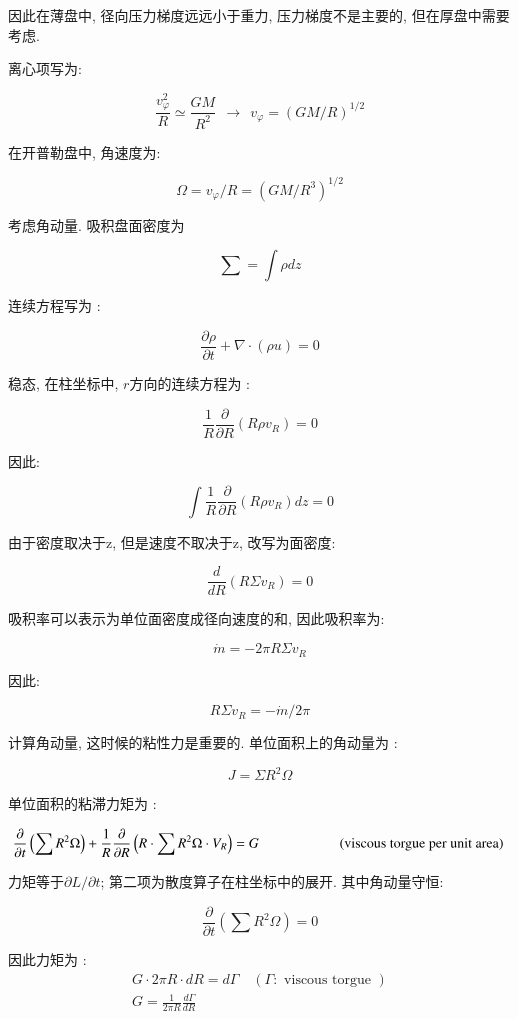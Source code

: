 \documentclass[fontset=windows]{report}
\begin{document}
因此在薄盘中, 径向压力梯度远远小于重力, 压力梯度不是主要的,
但在厚盘中需要考虑.

离心项写为:

\[\frac {v_{\varphi}^2}{R}\simeq \frac{GM}{R^2}\ \ \longrightarrow\ \  v_{\varphi}=(GM/R)^{1/2}\]

在开普勒盘中, 角速度为:

\[\Omega=v_{\varphi}/R=(GM/R^3)^{1/2}\]

考虑角动量. 吸积盘面密度为

\[\sum = \int \rho dz\]

连续方程写为 :

\[\frac{\partial \rho}{\partial t}+\nabla\cdot(\rho u)=0\]

稳态, 在柱坐标中, \(r\)方向的连续方程为 :

\[\frac 1 R \frac{\partial}{\partial R}({R\rho v_R})=0\]

因此:

\[\int \frac 1 R \frac{\partial}{\partial R}({R\rho v_R})dz=0\]

由于密度取决于z, 但是速度不取决于z, 改写为面密度:

\[\frac{d}{dR}(R\Sigma v_R)=0\]

吸积率可以表示为单位面密度成径向速度的和, 因此吸积率为:

\[\dot m=- 2\pi R\Sigma v_R\]

因此:

\[R\Sigma v_R=-\dot m/2\pi\]

计算角动量, 这时候的粘性力是重要的. 单位面积上的角动量为 :

\[J = \Sigma R^2\Omega\]

单位面积的粘滞力矩为 :

\[\frac{\partial}{\partial t}\left(\sum R^{2} \Omega\right)+\frac{1}{R} \frac{\partial}{\partial R}\left(R \cdot \sum R^{2} \Omega \cdot V_{R}\right)=G \\ \ \ \ \ \ \ \ \ \ \ \ \ \ \ \ \ \ \ \ \ \ \  \text { (viscous torgue per unit area) }\]

力矩等于\(\partial L/\partial t\); 第二项为散度算子在柱坐标中的展开.
其中角动量守恒:

\[\frac \partial {\partial t}\left(\sum R^{2} \Omega\right)=0\]

因此力矩为 :
\begin{equation}
  \begin{array}{c}
    G \cdot 2 \pi R \cdot d R=d \Gamma \quad(\Gamma: \text { viscous torgue }) \\
    G=\frac{1}{2 \pi R} \frac{d \Gamma}{d R}
  \end{array}  
\end{equation}
\end{document}
